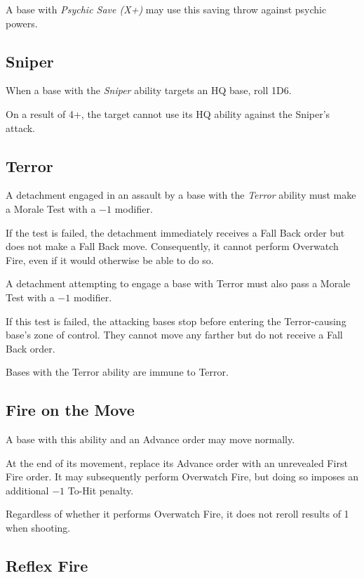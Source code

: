 A base with \textit{Psychic Save (X+)} may use this saving throw against psychic powers.

\subsection{Sniper}

When a base with the \textit{Sniper} ability targets an HQ base, roll 1D6.

On a result of 4+, the target cannot use its HQ ability against the Sniper's attack.

\subsection{Terror}

A detachment engaged in an assault by a base with the \textit{Terror} ability must make a Morale Test with a $-1$ modifier.

If the test is failed, the detachment immediately receives a Fall Back order but does not make a Fall Back move. Consequently, it cannot perform Overwatch Fire, even if it would otherwise be able to do so.

A detachment attempting to engage a base with Terror must also pass a Morale Test with a $-1$ modifier.

If this test is failed, the attacking bases stop before entering the Terror-causing base's zone of control. They cannot move any farther but do not receive a Fall Back order.

Bases with the Terror ability are immune to Terror.

\subsection{Fire on the Move}

A base with this ability and an Advance order may move normally.

At the end of its movement, replace its Advance order with an unrevealed First Fire order. It may subsequently perform Overwatch Fire, but doing so imposes an additional $-1$ To-Hit penalty.

Regardless of whether it performs Overwatch Fire, it does not reroll results of 1 when shooting.

\subsection{Reflex Fire}

